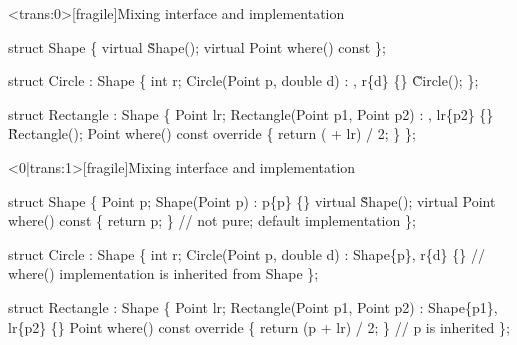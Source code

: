 \begin{frame}<trans:0>[fragile]{Mixing interface and implementation}

  \begin{codeblock}
struct Shape \{
  virtual \~Shape();
  virtual Point where() const 
\};

struct Circle : Shape \{
  int r;
  Circle(Point p, double d) : , r\{d\} \{\}
  \~Circle();
\};

struct Rectangle : Shape \{
  Point lr;
  Rectangle(Point p1, Point p2) : , lr\{p2\} \{\}
  \~Rectangle();
  Point where() const override \{ return ( + lr) / 2; \}
\};\end{codeblock}


\end{frame}

\begin{frame}<0|trans:1>[fragile]{Mixing interface and implementation}

  \begin{codeblock}{
struct Shape \{
  \alert{Point p;}
  Shape(Point p) : p\{p\} \{\}
  virtual \~Shape();
  virtual Point where() const \{ return p; \} // \alert{not pure; default implementation}
\};

struct Circle : Shape \{
  int r;
  Circle(Point p, double d) : \alert{Shape\{p\}}, r\{d\} \{\}
  // where() implementation is inherited from Shape
\};

struct Rectangle : Shape \{
  Point lr;
  Rectangle(Point p1, Point p2) : \alert{Shape\{p1\}}, lr\{p2\} \{\}
  Point where() const override \{ return (\alert{p} + lr) / 2; \} // \alert{p is inherited}
\};
}\end{codeblock}


\end{frame}

